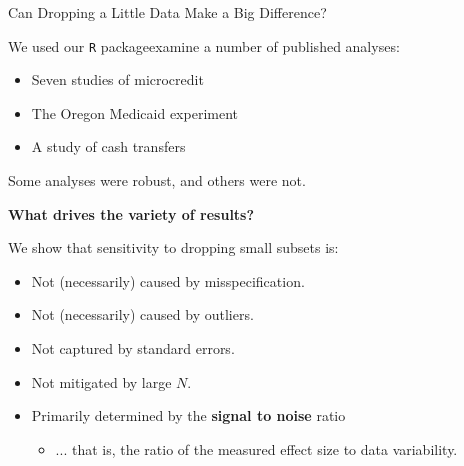 
\begin{frame}[t]{Can Dropping a Little Data Make a Big Difference?}

\vspace{1em} We used our \texttt{R} package\footnotemark[1]
examine a number of published analyses:
\begin{itemize}
    \item Seven studies of microcredit \citep{meager2020aggregating}
    \item The Oregon Medicaid experiment \citep{finkelstein2012oregon}
    \item A study of cash transfers \citep{angelucci2009indirect}
\end{itemize}
%
Some analyses were robust, and others were not.

\pause
\vspace{1em}
\textbf{What drives the variety of results?}

We show that sensitivity
to dropping small subsets is:

\begin{itemize}
    \item Not (necessarily) caused by misspecification.
    \item Not (necessarily) caused by outliers.
    \item Not captured by standard errors.
    \item Not mitigated by large $N$.
    \item Primarily determined by the \textbf{signal to noise} ratio
    \begin{itemize}
        \item[] ... that is, the ratio of the measured effect size to data
        variability.
    \end{itemize}
\end{itemize}


\end{frame}
